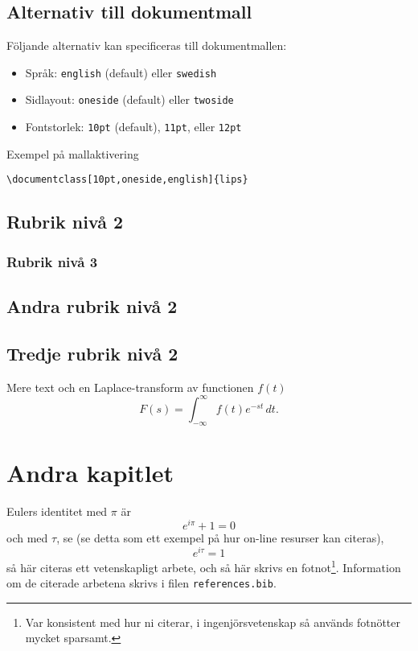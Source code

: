 \documentclass[10pt,oneside,swedish]{lips-no_customer}
\begin{document}
\subsection{Alternativ till dokumentmall}
Följande alternativ kan specificeras till dokumentmallen:
\begin{itemize}
\item Språk: \texttt{english} (default) eller \texttt{swedish}
\item Sidlayout: \texttt{oneside} (default) eller \texttt{twoside}
\item Fontstorlek: \texttt{10pt} (default), \texttt{11pt}, eller \texttt{12pt}
\end{itemize}
Exempel på mallaktivering
\begin{verbatim}
\documentclass[10pt,oneside,english]{lips}
\end{verbatim}
\subsection{Rubrik nivå 2}
\label{sec:rubrik-niva-2}
\lipsum[7]

\subsubsection{Rubrik nivå 3}
\label{sec:rubrik-niva-3}
\lipsum[7]

\subsection{Andra rubrik nivå 2}
\lipsum[7]

\subsection{Tredje rubrik nivå 2}
Mere text och en Laplace-transform av functionen $f(t)$
\begin{equation}
  F(s) = \int_{-\infty}^{\infty} f(t)e^{-st}\,dt.
\end{equation}

\section{Andra kapitlet}
Eulers identitet med $\pi$ är
\begin{equation}
  e^{i\pi} + 1 = 0
\end{equation}
och med $\tau$, se \citep{HartVi:2011} (se detta som ett exempel på
hur on-line resurser kan citeras), 
\begin{equation}
  e^{i\tau} = 1
\end{equation}
så här citeras ett vetenskapligt arbete\citep{einstein1905uber}, och
så här skrivs en fotnot\footnote{Var konsistent med hur ni citerar, i
  ingenjörsvetenskap så används fotnötter mycket
  sparsamt.}. Information om de citerade arbetena skrivs i filen \texttt{references.bib}.
\end{document}
